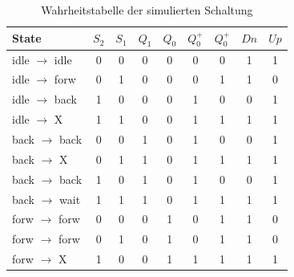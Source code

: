 \documentclass[
    paper=a4,
]{scrartcl}
\newcommand{\edit}[1]{\textcolor{colorred}{#1}}
\begin{document}
    \begin{table}
        \centering
        \caption{Wahrheitstabelle der simulierten Schaltung}
        \label{tab:8}
        \begin{tabular}{l|cccc|cccc}\toprule
            State                                   &   $S_2$   &   $S_1$   &   $Q_1$   &   $Q_0$   &   \edit{$Q_0^+$}  &   \edit{$Q_0^+$} &   $Dn$    &   $Up$\\\midrule
            idle $\rightarrow$ idle                 &   0       &   0       &   0       &   0       &   \edit{0}        &   \edit{0}       &   1       &   1\\
            idle $\rightarrow$ \edit{forw}          &   0       &   1       &   0       &   0       &   \edit{0}               &   \edit{1}         &    1    &   0\\
            idle $\rightarrow$ \edit{back}          &   1       &   0       &   0       &   0       &   \edit{1}        &   \edit{0}        &     0    &   1\\
            \edit{idle $\rightarrow$ X}             &   \edit{1}       &   \edit{1}       &   \edit{0}       &   \edit{0}       &   \edit{1}        &   \edit{1}        &     \edit{1}    &   \edit{1}\\\midrule
            \edit{back} $\rightarrow$ \edit{back}   &   0       &   0       &   1       &   0       &   \edit{1}        &   \edit{0}        &     0       &   1\\
            \edit{back} $\rightarrow$ X             &   0       &   1       &   1       &   0       &   \edit{1}        &   \edit{1}        &     1       &   1\\
            \edit{back} $\rightarrow$ \edit{back}   &   1       &   0       &   1       &   0       &   \edit{1}        &   \edit{0}        &     0       &   1\\
            \edit{back} $\rightarrow$ wait          &   1       &   1       &   1       &   0       &   \edit{1}        &   \edit{1}        &     1       &   1\\\midrule
            \edit{forw} $\rightarrow$ \edit{forw}   &   0       &   0       &   0       &   1       &   \edit{0}        &   \edit{1}        &     1       &   0\\
            \edit{forw} $\rightarrow$ \edit{forw}   &   0       &   1       &   0       &   1       &   \edit{0}        &   \edit{1}        &     1       &   0\\
            \edit{forw} $\rightarrow$ X             &   1       &   0       &   0       &   1       &   \edit{1}        &   \edit{1}        &     1       &   1\\

\end{tabular}
\end{table}
\end{document}
